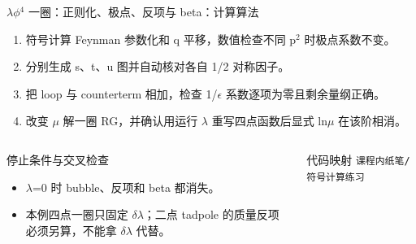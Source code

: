 \begin{frame}[t]{\ensuremath{\lambda}\ensuremath{\phi}\ensuremath{^{4}} 一圈：正则化、极点、反项与 beta：计算算法}
\footnotesize
{}\begin{enumerate}
\item 符号计算 Feynman 参数化和 q 平移，数值检查不同 p\ensuremath{^{2}} 时极点系数不变。
\item 分别生成 s、t、u 图并自动核对各自 1/\allowbreak{}2 对称因子。
\item 把 loop 与 counterterm 相加，检查 1/\allowbreak{}\ensuremath{\epsilon} 系数逐项为零且剩余量纲正确。
\item 改变 \ensuremath{\mu} 解一圈 RG，并确认用运行 \ensuremath{\lambda} 重写四点函数后显式 ln\ensuremath{\mu} 在该阶相消。
\end{enumerate}\begin{columns}[T,onlytextwidth]
\begin{block}{停止条件与交叉检查}\scriptsize\begin{itemize}
\item[\CheckMark] \ensuremath{\lambda}=0 时 bubble、反项和 beta 都消失。
\item[\CheckMark] 本例四点一圈只固定 \ensuremath{\delta}\ensuremath{\lambda}；二点 tadpole 的质量反项必须另算，不能拿 \ensuremath{\delta}\ensuremath{\lambda} 代替。
\end{itemize}\end{block}
\begin{block}{代码映射}
\scriptsize \texttt{课程内纸笔/\allowbreak{}符号计算练习}
\end{block}\end{columns}\end{frame}

